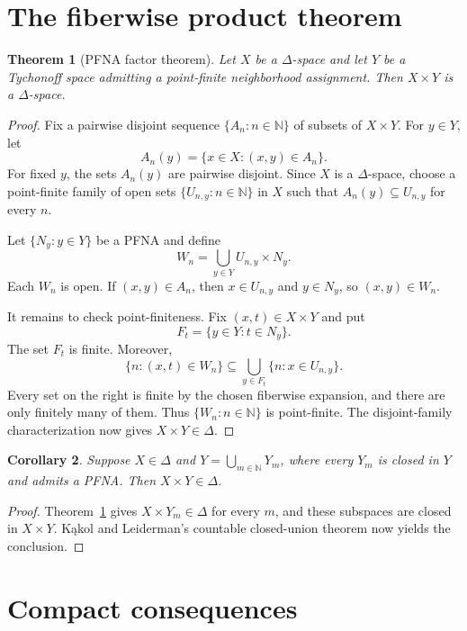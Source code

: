 \documentclass[11pt]{article}
\newtheorem{theorem}{Theorem}
\newtheorem{corollary}[theorem]{Corollary}
\begin{document}
\section{The fiberwise product theorem}

\begin{theorem}[PFNA factor theorem]\label{thm:pfna}
Let $X$ be a $\Delta$-space and let $Y$ be a Tychonoff space admitting a
point-finite neighborhood assignment.  Then $X\times Y$ is a $\Delta$-space.
\end{theorem}

\begin{proof}
Fix a pairwise disjoint sequence $\{A_n:n\in\mathbb N\}$ of subsets of
$X\times Y$.  For $y\in Y$, let
\[
 A_n(y)=\{x\in X:(x,y)\in A_n\}.
\]
For fixed $y$, the sets $A_n(y)$ are pairwise disjoint.  Since $X$ is a
$\Delta$-space, choose a point-finite family of open sets
$\{U_{n,y}:n\in\mathbb N\}$ in $X$ such that
$A_n(y)\subseteq U_{n,y}$ for every $n$.

Let $\{N_y:y\in Y\}$ be a PFNA and define
\[
 W_n=\bigcup_{y\in Y} U_{n,y}\times N_y.
\]
Each $W_n$ is open.  If $(x,y)\in A_n$, then $x\in U_{n,y}$ and
$y\in N_y$, so $(x,y)\in W_n$.

It remains to check point-finiteness.  Fix $(x,t)\in X\times Y$ and put
\[
 F_t=\{y\in Y:t\in N_y\}.
\]
The set $F_t$ is finite.  Moreover,
\[
 \{n:(x,t)\in W_n\}
 \subseteq
 \bigcup_{y\in F_t}\{n:x\in U_{n,y}\}.
\]
Every set on the right is finite by the chosen fiberwise expansion, and there
are only finitely many of them.  Thus $\{W_n:n\in\mathbb N\}$ is point-finite.
The disjoint-family characterization now gives $X\times Y\in\Delta$.
\end{proof}

\begin{corollary}\label{cor:closedcover}
Suppose $X\in\Delta$ and
$Y=\bigcup_{m\in\mathbb N}Y_m$, where every $Y_m$ is closed in $Y$ and admits
a PFNA.  Then $X\times Y\in\Delta$.
\end{corollary}

\begin{proof}
Theorem~\ref{thm:pfna} gives $X\times Y_m\in\Delta$ for every $m$, and these
subspaces are closed in $X\times Y$.  K\k{a}kol and Leiderman's countable
closed-union theorem \cite[Proposition~2.2]{KL2} now yields the conclusion.
\end{proof}

\section{Compact consequences}
\end{document}
